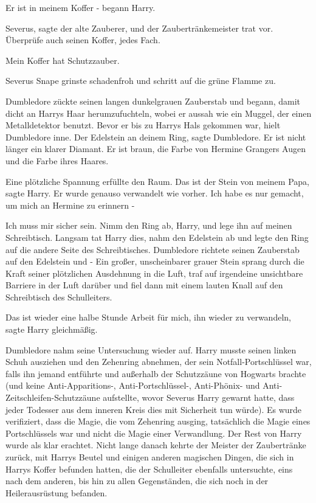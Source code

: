 \glqq{}Er ist in meinem Koffer -\grqq{} begann Harry.

\glqq{}Severus\grqq{}, sagte der alte Zauberer, und der Zaubertränkemeister trat
vor. \glqq{}Überprüfe auch seinen Koffer, jedes Fach.\grqq{}

\glqq{}Mein Koffer hat Schutzzauber.\grqq{}

Severus Snape grinste schadenfroh und schritt auf die grüne Flamme zu.

Dumbledore zückte seinen langen dunkelgrauen Zauberstab und begann, damit dicht
an Harrys Haar herumzufuchteln, wobei er aussah wie ein Muggel, der einen
Metalldetektor benutzt. Bevor er bis zu Harrys Hals gekommen war, hielt
Dumbledore inne. \glqq{}Der Edelstein an deinem Ring\grqq{}, sagte Dumbledore.
\glqq{}Er ist nicht länger ein klarer Diamant. Er ist braun, die Farbe von
Hermine Grangers Augen und die Farbe ihres Haares.\grqq{}

Eine plötzliche Spannung erfüllte den Raum. \glqq{}Das ist der Stein von meinem
Papa\grqq{}, sagte Harry. \glqq{}Er wurde genauso verwandelt wie vorher. Ich
habe es nur gemacht, um mich an Hermine zu erinnern -\grqq{}

\glqq{}Ich muss mir sicher sein. Nimm den Ring ab, Harry, und lege ihn auf meinen
Schreibtisch.\grqq{} Langsam tat Harry dies, nahm den Edelstein ab und legte den
Ring auf die andere Seite des Schreibtisches. Dumbledore richtete seinen
Zauberstab auf den Edelstein und - Ein großer, unscheinbarer grauer Stein sprang
durch die Kraft seiner plötzlichen Ausdehnung in die Luft, traf auf irgendeine
unsichtbare Barriere in der Luft darüber und fiel dann mit einem lauten Knall
auf den Schreibtisch des Schulleiters.

\glqq{}Das ist wieder eine halbe Stunde Arbeit für mich, ihn wieder zu
verwandeln\grqq{}, sagte Harry gleichmäßig.

Dumbledore nahm seine Untersuchung wieder auf. Harry musste seinen linken Schuh
ausziehen und den Zehenring abnehmen, der sein Notfall-Portschlüssel war, falls
ihn jemand entführte und außerhalb der Schutzzäune von Hogwarts brachte (und
keine Anti-Apparitions-, Anti-Portschlüssel-, Anti-Phönix- und
Anti-Zeitschleifen-Schutzzäune aufstellte, wovor Severus Harry gewarnt hatte,
dass jeder Todesser aus dem inneren Kreis dies mit Sicherheit tun würde). Es
wurde verifiziert, dass die Magie, die vom Zehenring ausging, tatsächlich die
Magie eines Portschlüssels war und nicht die Magie einer Verwandlung. Der Rest
von Harry wurde als klar erachtet. Nicht lange danach kehrte der Meister der
Zaubertränke zurück, mit Harrys Beutel und einigen anderen magischen Dingen, die
sich in Harrys Koffer befunden hatten, die der Schulleiter ebenfalls
untersuchte, eins nach dem anderen, bis hin zu allen Gegenständen, die sich noch
in der Heilerausrüstung befanden.

